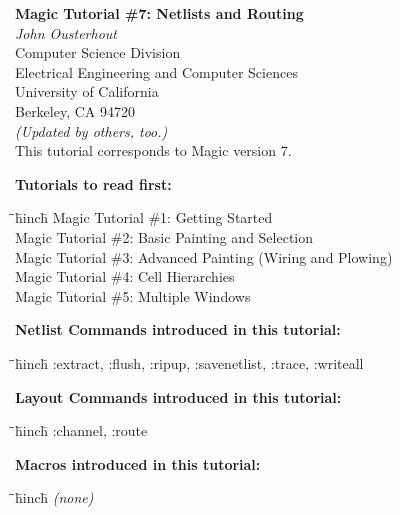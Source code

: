 \documentclass[letterpaper,twoside,12pt]{article}
\def\hinch{\hspace*{0.5in}}
\def\starti{\begin{center}\begin{tabbing}\hinch\=\hinch\=\hinch\=hinch\hinch\=\kill}
\def\endi{\end{tabbing}\end{center}}
\def\mytitle{Magic Tutorial \#7: Netlists and Routing}
\begin{document}
\makeatletter
\newcommand{\ps@magic}{%
	\renewcommand{\@oddhead}{\mytitle\hfil\today}%
	\renewcommand{\@evenhead}{\today\hfil\mytitle}%
	\renewcommand{\@evenfoot}{\hfil\textrm{--{\thepage}--}\hfil}%
	\renewcommand{\@oddfoot}{\@evenfoot}}
\newcommand{\ps@mplain}{%
	\renewcommand{\@oddhead}{}%
	\renewcommand{\@evenhead}{}%
	\renewcommand{\@evenfoot}{\hfil\textrm{--{\thepage}--}\hfil}%
	\renewcommand{\@oddfoot}{\@evenfoot}}
\makeatother
\pagestyle{magic}
\thispagestyle{mplain}


\begin{center}
  {\bfseries \Large \mytitle} \\
  \vspace*{0.5in}
  {\itshape John Ousterhout} \\
  \vspace*{0.5in}
   Computer Science Division \\
   Electrical Engineering and Computer Sciences \\
   University of California \\
   Berkeley, CA  94720 \\
  \vspace*{0.25in}
  {\itshape (Updated by others, too.)} \\
  \vspace*{0.25in}
  This tutorial corresponds to Magic version 7. \\
\end{center}
\vspace*{0.5in}

{\noindent\bfseries\large Tutorials to read first:}
\starti
   \> Magic Tutorial  \#1: Getting Started \\
   \> Magic Tutorial \#2: Basic Painting and Selection \\
   \> Magic Tutorial \#3: Advanced Painting (Wiring and Plowing) \\
   \> Magic Tutorial \#4: Cell Hierarchies \\
   \> Magic Tutorial \#5: Multiple Windows \\
\endi

{\noindent\bfseries\large Netlist Commands introduced in this tutorial:}
\starti
   \> :extract, :flush, :ripup, :savenetlist, :trace, :writeall
\endi

{\noindent\bfseries\large Layout Commands introduced in this tutorial:}
\starti
   \> :channel, :route
\endi

{\noindent\bfseries\large Macros introduced in this tutorial:}

\starti
   \> {\itshape (none)}
\endi
\end{document}
